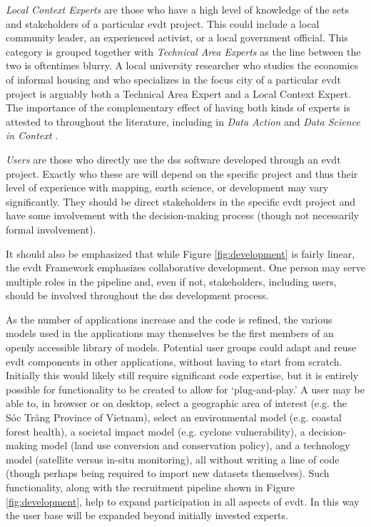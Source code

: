 \textit{Local Context Experts} are those who have a high level of knowledge of the \ac{sets} and stakeholders of a particular \ac{evdt} project. This could include a local community leader, an experienced activist, or a local government official. This category is grouped together with \textit{Technical Area Experts} as the line between the two is oftentimes blurry. A local university researcher who studies the economics of informal housing and who specializes in the focus city of a particular \ac{evdt} project is arguably both a Technical Area Expert and a Local Context Expert. The importance of the complementary effect of having both kinds of experts is attested to throughout the literature, including in \textit{Data Action} \cite{williamsDataActionUsing2020} and \textit{Data Science in Context} \cite{spectorDataScienceContext2022}. 

\textit{Users} are those who directly use the \ac{dss} software developed through an \ac{evdt} project. Exactly who these are will depend on the specific project and thus their level of experience with mapping, earth science, or development may vary significantly. They should be direct stakeholders in the specific \ac{evdt} project and have some involvement with the decision-making process (though not necessarily formal involvement). 

It should also be emphasized that while Figure \ref{fig:development} is fairly linear, the \ac{evdt} Framework emphasizes collaborative development. One person may serve multiple roles in the pipeline and, even if not, stakeholders, including users, should be involved throughout the \ac{dss} development process.

As the number of applications increase and the code is refined, the various models used in the applications may themselves be the first members of an openly accessible library of models. Potential user groups could adapt and reuse \ac{evdt} components in other applications, without having to start from scratch. Initially this would likely still require significant code expertise, but it is entirely possible for functionality to be created to allow for `plug-and-play.' A user may be able to, in browser or on desktop, select a geographic area of interest (e.g. the Sóc Trăng Province of Vietnam), select an environmental model (e.g. coastal forest health), a societal impact model (e.g. cyclone vulnerability), a decision-making model (land use conversion and conservation policy), and a technology model (satellite versus in-situ monitoring), all without writing a line of code (though perhaps being required to import new datasets themselves). Such functionality, along with the recruitment pipeline shown in Figure \ref{fig:development}, help to expand participation in all aspects of \ac{evdt}. In this way the user base will be expanded beyond initially invested experts.


